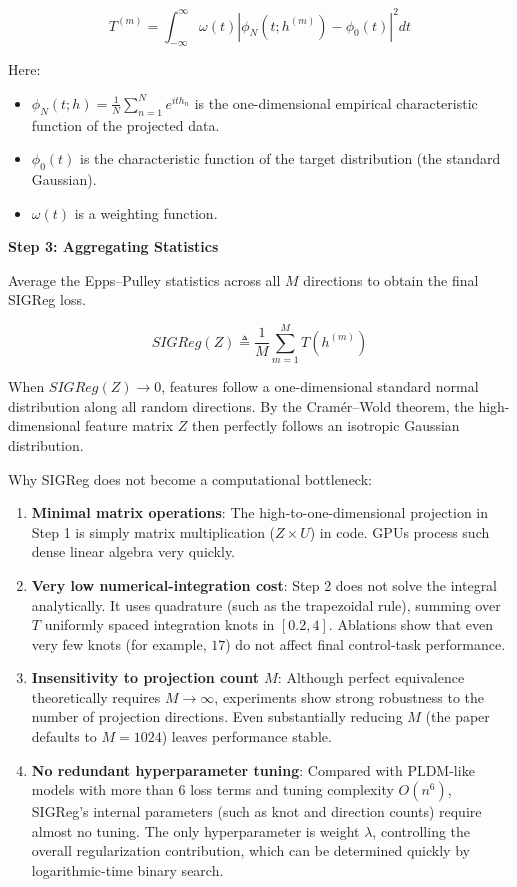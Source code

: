\[
T^{(m)} = \int_{-\infty}^{\infty} \omega(t)\left|\phi_N(t;h^{(m)}) - \phi_0(t)\right|^2 dt
\]

Here:

\begin{itemize}
\tightlist
\item
  \(\phi_N(t;h)=\frac{1}{N}\sum_{n=1}^{N} e^{ith_n}\) is the one-dimensional empirical characteristic function of the projected data.
\item
  \(\phi_0(t)\) is the characteristic function of the target distribution (the standard Gaussian).
\item
  \(\omega(t)\) is a weighting function.
\end{itemize}

\textbf{Step 3: Aggregating Statistics}

Average the Epps--Pulley statistics across all \(M\) directions to obtain the final SIGReg loss.

\[
SIGReg(Z) \triangleq \frac{1}{M}\sum_{m=1}^{M}T(h^{(m)})
\]

When \(SIGReg(Z)\to 0\), features follow a one-dimensional standard normal distribution along all random directions. By the Cramér--Wold theorem, the high-dimensional feature matrix \(Z\) then perfectly follows an isotropic Gaussian distribution.

Why SIGReg does not become a computational bottleneck:

\begin{enumerate}
\def\labelenumi{\arabic{enumi}.}
\tightlist
\item
  \textbf{Minimal matrix operations}: The high-to-one-dimensional projection in Step 1 is simply matrix multiplication (\(Z\times U\)) in code. GPUs process such dense linear algebra very quickly.
\item
  \textbf{Very low numerical-integration cost}: Step 2 does not solve the integral analytically. It uses quadrature (such as the trapezoidal rule), summing over \(T\) uniformly spaced integration knots in \([0.2,4]\). Ablations show that even very few knots (for example, \(17\)) do not affect final control-task performance.
\item
  \textbf{Insensitivity to projection count \(M\)}: Although perfect equivalence theoretically requires \(M\to\infty\), experiments show strong robustness to the number of projection directions. Even substantially reducing \(M\) (the paper defaults to \(M=1024\)) leaves performance stable.
\item
  \textbf{No redundant hyperparameter tuning}: Compared with PLDM-like models with more than \(6\) loss terms and tuning complexity \(O(n^6)\), SIGReg's internal parameters (such as knot and direction counts) require almost no tuning. The only hyperparameter is weight \(\lambda\), controlling the overall regularization contribution, which can be determined quickly by logarithmic-time binary search.
\end{enumerate}

